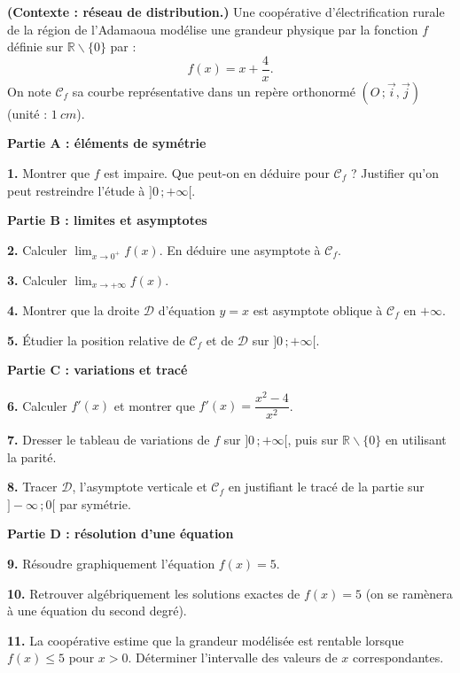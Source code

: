 \documentclass[11pt]{article}
\def\setminus{\mathbin{\backslash}}\let\smallsetminus\setminus
\begin{document}
\begin{exercice}
\textbf{(Contexte : réseau de distribution.)} Une coopérative d'électrification rurale de la région de l'Adamaoua modélise une grandeur physique par la fonction $f$ définie sur $\mathbb{R}\setminus\{0\}$ par :
\[ f(x)=x+\dfrac{4}{x}. \]
On note $\mathcal{C}_f$ sa courbe représentative dans un repère orthonormé $(O\,;\vec{i},\vec{j})$ (unité : $\SI{1}{cm}$).

\textbf{Partie A : éléments de symétrie}

\textbf{1.} Montrer que $f$ est impaire. Que peut-on en déduire pour $\mathcal{C}_f$ ? Justifier qu'on peut restreindre l'étude à $]0\,;+\infty[$.

\textbf{Partie B : limites et asymptotes}

\textbf{2.} Calculer $\displaystyle\lim_{x\to 0^+}f(x)$. En déduire une asymptote à $\mathcal{C}_f$.

\textbf{3.} Calculer $\displaystyle\lim_{x\to +\infty}f(x)$.

\textbf{4.} Montrer que la droite $\mathcal{D}$ d'équation $y=x$ est asymptote oblique à $\mathcal{C}_f$ en $+\infty$.

\textbf{5.} Étudier la position relative de $\mathcal{C}_f$ et de $\mathcal{D}$ sur $]0\,;+\infty[$.

\textbf{Partie C : variations et tracé}

\textbf{6.} Calculer $f'(x)$ et montrer que $f'(x)=\dfrac{x^2-4}{x^2}$.

\textbf{7.} Dresser le tableau de variations de $f$ sur $]0\,;+\infty[$, puis sur $\mathbb{R}\setminus\{0\}$ en utilisant la parité.

\textbf{8.} Tracer $\mathcal{D}$, l'asymptote verticale et $\mathcal{C}_f$ en justifiant le tracé de la partie sur $]-\infty\,;0[$ par symétrie.

\textbf{Partie D : résolution d'une équation}

\textbf{9.} Résoudre graphiquement l'équation $f(x)=5$.

\textbf{10.} Retrouver algébriquement les solutions exactes de $f(x)=5$ (on se ramènera à une équation du second degré).

\textbf{11.} La coopérative estime que la grandeur modélisée est rentable lorsque $f(x)\leq 5$ pour $x>0$. Déterminer l'intervalle des valeurs de $x$ correspondantes.
\end{exercice}
\end{document}
